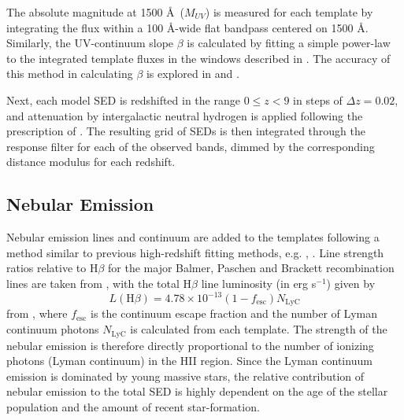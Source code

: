 The absolute magnitude at 1500 \AA ~($M_{UV}$) is measured for each template by integrating the flux within a 100 \AA-wide flat bandpass centered on 1500 \AA. Similarly, the UV-continuum slope $\beta$ is calculated by fitting a simple power-law to the integrated template fluxes in the windows described in \citet{1994ApJ...429..582C}. The accuracy of this method in calculating $\beta$ is explored in \citet{Finkelstein:2012hr} and \citet{2013MNRAS.429.2456R}.

Next, each model SED is redshifted in the range $0 \le z < 9$ in steps of $\Delta z = 0.02$, and attenuation by intergalactic neutral hydrogen is applied following the prescription of \citet{1995ApJ...441...18M}. The resulting grid of SEDs is then integrated through the response filter for each of the observed bands, dimmed by the corresponding distance modulus for each redshift.

\subsection{Nebular Emission}\label{subsection:nebular}
Nebular emission lines and continuum are added to the templates following a method similar to previous high-redshift fitting methods, e.g.  \citet{Ono:2010ed,2010A&A...515A..73S,2011MNRAS.418.2074M}, \citet{2015ApJ...799..183S}. Line strength ratios relative to H$\beta$ for the major Balmer, Paschen and Brackett recombination lines are taken from \citet{Osterbrock:2006ula}, with the total H$\beta$ line luminosity (in erg s$^{-1}$) given by
\begin{equation}
L(\text{H}\beta) = 4.78 \times10^{-13} (1-f_{\text{esc}}) N_{\text{LyC}}
\end{equation}
from \citet{1995A&A...303...41K}, where $f_{\text{esc}}$ is the continuum escape fraction and the number of Lyman continuum photons $N_{\text{LyC}}$ is calculated from each template. The strength of the nebular emission is therefore directly proportional to the number of ionizing photons (Lyman continuum) in the HII region. Since the Lyman continuum emission is dominated by young massive stars, the relative contribution of nebular emission to the total SED is highly dependent on the age of the stellar population and the amount of recent star-formation.  
 
